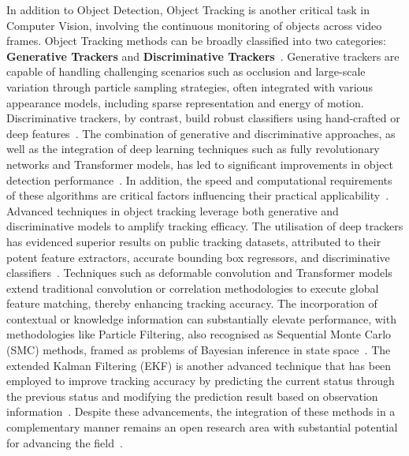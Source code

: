 \documentclass[12pt,oneside]{book} %
\begin{document}
In addition to Object Detection, Object Tracking is another critical task in
Computer Vision, involving the continuous monitoring of objects across video
frames. Object Tracking methods can be broadly classified into two categories:
\textbf{Generative Trackers} and \textbf{Discriminative
    Trackers}~\cite{SurveyVisualOT}. Generative trackers are capable of handling
challenging scenarios such as occlusion and large-scale variation through
particle sampling strategies, often integrated with various appearance models,
including sparse representation and energy of motion. Discriminative trackers,
by contrast, build robust classifiers using hand-crafted or deep
features~\cite{SurveyVisualOT}. The combination of generative and
discriminative approaches, as well as the integration of deep learning
techniques such as fully revolutionary networks and Transformer models, has led
to significant improvements in object detection
performance~\cite{OverviewCorrelationAlgoOT, SuveyAdvancesSingleOTMethods,
    SurveyModernODModels}. In addition, the speed and computational requirements of
these algorithms are critical factors influencing their practical
applicability~\cite{SuveyAdvancesSingleOTMethods, SurveyModernODModels,
    SurveyTransformersSingleOT}. Advanced techniques in object tracking leverage
both generative and discriminative models to amplify tracking efficacy. The
utilisation of deep trackers has evidenced superior results on public tracking
datasets, attributed to their potent feature extractors, accurate bounding box
regressors, and discriminative classifiers~\cite{SurveyTransformersSingleOT}.
Techniques such as deformable convolution and Transformer models extend
traditional convolution or correlation methodologies to execute global feature
matching, thereby enhancing tracking accuracy. The incorporation of contextual
or knowledge information can substantially elevate performance, with
methodologies like Particle Filtering, also recognised as Sequential Monte
Carlo (SMC) methods, framed as problems of Bayesian inference in state
space~\cite{SurveySmallObjectDetection, SmallObjectDetectionPositonPrediction}.
The extended Kalman Filtering (EKF) is another advanced technique that has been
employed to improve tracking accuracy by predicting the current status through
the previous status and modifying the prediction result based on observation
information~\cite{SuveyAdvancesSingleOTMethods, SurveyModernODModels}. Despite
these advancements, the integration of these methods in a complementary manner
remains an open research area with substantial potential for advancing the
field~\cite{OverviewCorrelationAlgoOT, SuveyAdvancesSingleOTMethods}.
\end{document}

